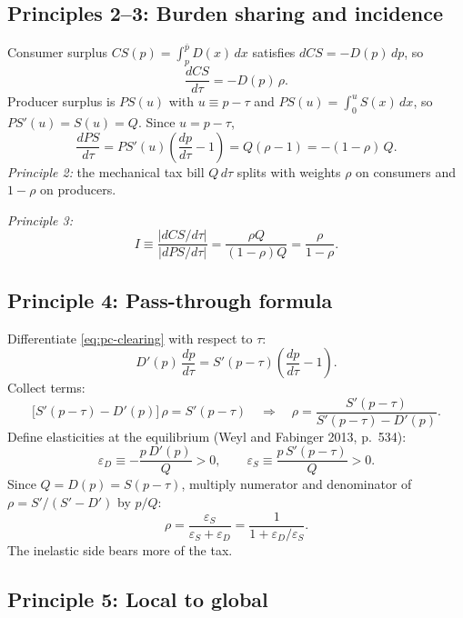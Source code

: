 \documentclass[11pt]{article}
\begin{document}
\subsection{Principles 2--3: Burden sharing and incidence}

Consumer surplus $CS(p) = \int_p^{\bar p} D(x)\,dx$ satisfies
$dCS = -D(p)\,dp$, so
\begin{equation}
  \frac{dCS}{d\tau} = -D(p)\,\rho.
  \label{eq:pc-dcs}
\end{equation}
Producer surplus is $PS(u)$ with $u \equiv p - \tau$ and
$PS(u) = \int_0^u S(x)\,dx$, so $PS'(u) = S(u) = Q$.  Since
$u = p - \tau$,
\[
  \frac{dPS}{d\tau}
  = PS'(u)\left(\frac{dp}{d\tau} - 1\right)
  = Q(\rho - 1)
  = -(1-\rho)\,Q.
  \label{eq:pc-dps}
\]
\emph{Principle 2:} the mechanical tax bill $Q\,d\tau$ splits with weights
$\rho$ on consumers and $1-\rho$ on producers.

\emph{Principle 3:}
\[
  I \equiv \frac{|dCS/d\tau|}{|dPS/d\tau|}
  = \frac{\rho Q}{(1-\rho)Q}
  = \frac{\rho}{1-\rho}.
\]

\subsection{Principle 4: Pass-through formula}

Differentiate \eqref{eq:pc-clearing} with respect to $\tau$:
\[
  D'(p)\,\frac{dp}{d\tau}
  = S'(p-\tau)\left(\frac{dp}{d\tau} - 1\right).
\]
Collect terms:
\[
  \bigl[S'(p-\tau) - D'(p)\bigr]\,\rho = S'(p-\tau)
  \quad\Rightarrow\quad
  \rho = \frac{S'(p-\tau)}{S'(p-\tau) - D'(p)}.
\]
Define elasticities at the equilibrium (Weyl and Fabinger 2013, p.~534):
\[
  \varepsilon_D \equiv -\frac{p\,D'(p)}{Q} > 0,
  \qquad
  \varepsilon_S \equiv \frac{p\,S'(p-\tau)}{Q} > 0.
\]
Since $Q = D(p) = S(p-\tau)$, multiply numerator and denominator of
$\rho = S'/(S'-D')$ by $p/Q$:
\[
  \rho = \frac{\varepsilon_S}{\varepsilon_S + \varepsilon_D}
  = \frac{1}{1 + \varepsilon_D/\varepsilon_S}.
\]
The inelastic side bears more of the tax.

\subsection{Principle 5: Local to global}
\end{document}
